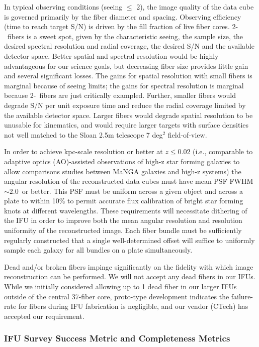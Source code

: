 \documentclass[preprint,11pt]{aastex}
\begin{document}
In typical observing conditions (seeing $\leq$ 2\arcsec), the image
quality of the data cube is governed primarily by the fiber diameter
and spacing. Observing efficiency (time to reach target S/N) is driven
by the fill fraction of live fiber cores. 2-\arcsec\ fibers is a sweet
spot, given by the characteristic seeing, the sample size, the desired
spectral resolution and radial coverage, the desired S/N and the
available detector space.  Better spatial and spectral resolution
would be highly advantageous for our science goals, but decreasing
fiber size provides little gain and several significant losses.  The
gains for spatial resolution with small fibers is marginal because of
seeing limits; the gains for spectral resolution is marginal because
2-\arcsec\ fibers are just critically exampled.  Further, smaller
fibers would degrade S/N per unit exposure time and reduce the radial
coverage limited by the available detector space. Larger fibers would
degrade spatial resolution to be unusable for kinematics, and would
require larger targets with surface densities not well matched to the
Sloan 2.5m telescope 7 deg$^2$ field-of-view.

In order to achieve kpc-scale resolution or better at $z\leq0.02$
(i.e., comparable to adaptive optics (AO)-assisted observations of
high-z star forming galaxies to allow comparisons studies between
MaNGA galaxies and high-z systems) the angular resolution of the
reconstructed data cubes must have mean PSF FWHM $\sim 2.0$\arcsec\ or
better. This PSF must be uniform across a given object and across a
plate to within 10\% to permit accurate flux calibration of bright
star forming knots at different wavelengths.  These requirements will
necessitate dithering of the IFU in order to improve both the mean
angular resolution and resolution uniformity of the reconstructed
image. Each fiber bundle must be sufficiently regularly constructed
that a single well-determined offset will suffice to uniformly sample
each galaxy for all bundles on a plate simultaneously.

Dead and/or broken fibers impinge significantly on the fidelity with
which image reconstruction can be performed. We will not accept any
dead fibers in our IFUs. While we initially considered allowing up to
1 dead fiber in our larger IFUs outside of the central 37-fiber core,
proto-type development indicates the failure-rate for fibers during
IFU fabrication is negligible, and our vendor (CTech) has accepted our
requirement.


\subsubsection{IFU Survey Success Metric and Completeness Metrics}
\end{document}
